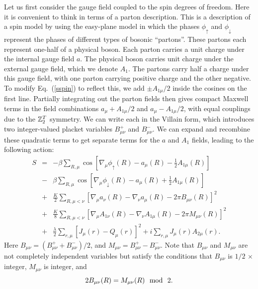 Let us first consider the gauge field coupled to the spin degrees of freedom. Here it is convenient to think in terms of a parton description. This is a description of a spin model by using the easy-plane \cp model in which the phases $\phi_\uparrow$ and $\phi_\downarrow$ represent the phases of different types of bosonic ``partons''. These partons each represent one-half of a physical boson. Each parton carries a unit charge under the internal gauge field $a$. The physical boson carries unit charge under the external gauge field, which we denote $A_1$. The partons carry half a charge under this gauge field, with one parton carrying positive charge and the other negative.
To modify Eq.~(\ref{sspin}) to reflect this, we add $\pm A_{1\mu}/2$ inside the cosines on the first line. 
Partially integrating out the parton fields then gives compact Maxwell terms in the field combinations $a_\mu+A_{1\mu}/2$ and $a_\mu-A_{1\mu}/2$, with equal couplings due to the $\mathbb{Z}_2^T$ symmetry. We can write each in the Villain form, which introduces two integer-valued placket variables $B^+_{\mu\nu}$ and $B^-_{\mu\nu}$. We can expand and recombine these quadratic terms to get separate terms for the $a$ and $A_1$ fields, leading to the following action:
\begin{eqnarray}
S&=&-\beta\sum_{R,\mu} \cos[\nabla_\mu\phi_\uparrow(R)-a_\mu(R)-\frac{1}{2}A_{1\mu}(R)]\nonumber\\
&-&\beta\sum_{R,\mu} \cos[\nabla_\mu\phi_\downarrow(R)-a_\mu(R)+\frac{1}{2}A_{1\mu}(R)]\nonumber\\
&+&\frac{K}{2}\sum_{R,\mu<\nu}\left[\nabla_\mu a_\nu(R)-\nabla_\nu a_\mu(R)-2\pi B_{\mu\nu}(R)\right]^2\nonumber\\
&+&\frac{K}{8}\sum_{R,\mu<\nu}\left[\nabla_\mu A_{1\nu}(R)-\nabla_\nu A_{1\mu}(R)-2\pi M_{\mu\nu}(R)\right]^2\nonumber\\
&+&\frac{\lambda}{2}\sum_{r,\mu} [ J_\mu(r)- Q_\mu(r)]^2+i\sum_{r,\mu}J_{\mu}(r)A_{2\mu}(r).
\label{withA}
\end{eqnarray}
Here $B_{\mu\nu}=(B^+_{\mu\nu}+B^-_{\mu\nu})/2$, and $M_{\mu\nu}=B^+_{\mu\nu}-B^-_{\mu\nu}$. Note that $B_{\mu\nu}$ and $M_{\mu\nu}$ are not completely independent variables but satisfy the conditions that $B_{\mu\nu}$ is $1/2$ $\times$ integer, $M_{\mu\nu}$ is integer, and 
\begin{equation}
2B_{\mu\nu}(R)=M_{\mu\nu}(R) ~~{\rm mod}~~2. 
\label{constraint}
\end{equation}
